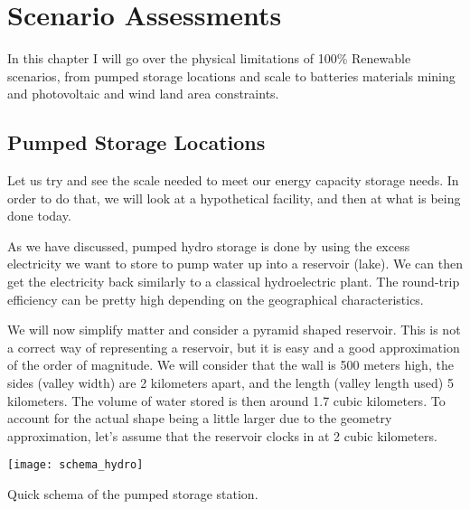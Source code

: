 \setchapterpreamble[u]{\margintoc}
\chapter{Scenario Assessments}

In this chapter I will go over the physical limitations of 100\% Renewable scenarios, from pumped storage locations and scale to batteries materials mining and photovoltaic and wind land area constraints.


\section{Pumped Storage Locations}

Let us try and see the scale needed to meet our energy capacity storage needs. In order to do that, we will look at a hypothetical facility, and then at what is being done today.

As we have discussed, pumped hydro storage is done by using the excess electricity we want to store to pump water up into a reservoir (lake). We can then get the electricity back similarly to a classical hydroelectric plant. The round-trip efficiency can be pretty high depending on the geographical characteristics.

We will now simplify matter and consider a pyramid shaped reservoir. This is not a correct way of representing a reservoir, but it is easy and a good approximation of the order of magnitude. We will consider that the wall is 500 meters high, the sides (valley width) are 2 kilometers apart, and the length (valley length used) 5 kilometers. The volume of water stored is then around 1.7 cubic kilometers. To account for the actual shape being a little larger due to the geometry approximation, let's assume that the reservoir clocks in at 2 cubic kilometers.

\begin{marginfigure}[-2mm]
	\texttt{[image: schema\_hydro]}
	\caption[Quick schema of the pumped storage station]{Quick schema of the pumped storage station.}
\end{marginfigure}


